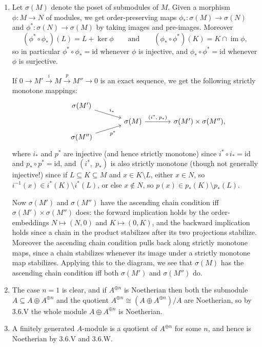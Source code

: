 \documentclass{report}
\newcommand{\id}{{\mathrm{id}}} %
\DeclareMathOperator{\im}{im}
\begin{document}
\begin{enumerate}[label=\textbf{3.6.\Alph*.}]
	\item Let $\sigma(M)$ denote the poset of submodules of $M$. Given a
	      morphism $\phi:M\to N$ of modules, we get order-preserving maps
	      $\phi_*:\sigma(M)\to\sigma(N)$ and $\phi^*:\sigma(N)\to\sigma(M)$ by
	      taking images and pre-images. Moreover
	      \begin{equation*}
		      (\phi^*\circ\phi_*)(L) = L + \ker\phi
		      \qquad\text{and}\qquad
		      (\phi_*\circ\phi^*)(K) = K\cap\im\phi,
	      \end{equation*}
	      so in particular $\phi^*\circ\phi_*=\id$ whenever $\phi$ is injective,
	      and $\phi_*\circ\phi^*=\id$ whenever $\phi$ is surjective.

	      If $0\to M'\xrightarrow{i}M\xrightarrow{p}M''\to0$ is an exact sequence,
	      we get the following strictly monotone mappings:
	      \begin{equation*}
		      \begin{tikzcd}[row sep=tiny,column sep=large]
			      &\sigma(M') \arrow{dr}{i_*} & & \\
			      & &\sigma(M) \arrow{r}{(i^*,\;p_*)} &\sigma(M')\times\sigma(M''), \\
			      &\sigma(M'') \arrow[swap]{ur}{p^*} & &
		      \end{tikzcd}
	      \end{equation*}
	      where $i_*$ and $p^*$ are injective (and hence strictly monotone) since
	      $i^*\circ i_*=\id$ and $p_*\circ p^*=\id$, and $(i^*,\;p_*)$ is also
	      strictly monotone (though not generally injective!) since if
	      $L\subseteq K\subseteq M$ and $x\in K\setminus L$, either $x\in N$, so
	      $i^{-1}(x)\in i^*(K)\setminus i^*(L)$, or else $x\notin N$, so
	      $p(x)\in p_*(K)\setminus p_*(L)$.

	      Now $\sigma(M')$ and $\sigma(M'')$ have the ascending chain condition
	      iff $\sigma(M')\times\sigma(M'')$ does: the forward implication holds
	      by the order-embeddings $N\mapsto(N,0)$ and $K\mapsto(0,K)$, and the
	      backward implication holds since a chain in the product stabilizes after
	      its two projections stabilize. Moreover the ascending chain condition
	      pulls back along strictly monotone maps, since a chain stabilizes
	      whenever its image under a strictly monotone map stabilizes. Applying
	      this to the diagram, we see that $\sigma(M)$ has the ascending chain
	      condition iff both $\sigma(M')$ and $\sigma(M'')$ do.

	\item The case $n=1$ is clear, and if $A^{\oplus n}$ is Noetherian then both
	      the submodule $A\subseteq A\oplus A^{\oplus n}$ and the quotient
	      $A^{\oplus n}\cong(A\oplus A^{\oplus n})/A$ are Noetherian, so by 3.6.V
	      the whole module $A\oplus A^{\oplus n}$ is Noetherian.

	\item A finitely generated $A$-module is a quotient of $A^{\oplus n}$ for
	      some $n$, and hence is Noetherian by 3.6.V and 3.6.W.
\end{enumerate}
\end{document}

